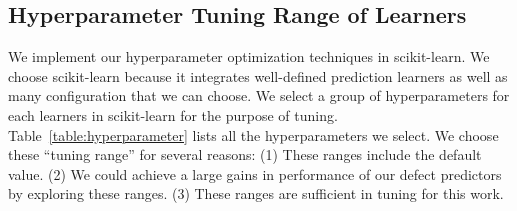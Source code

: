 \subsection{Hyperparameter Tuning Range of Learners}

We implement our hyperparameter optimization techniques in scikit-learn. We choose scikit-learn because it integrates well-defined prediction learners as well as many configuration that we can choose. We select a group of hyperparameters for each learners in scikit-learn for the purpose of tuning. Table~\ref{table:hyperparameter} lists all the hyperparameters we select. We choose these ``tuning range'' for several reasons: (1) These ranges include the default value. (2) We could achieve a large gains in performance of our defect predictors by exploring these ranges. (3) These ranges are sufficient in tuning for this work.

